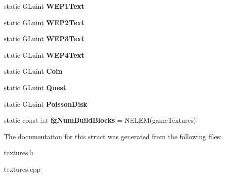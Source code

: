 \begin{DoxyCompactItemize}
\item 
\hypertarget{structGameTexture_a4ec826f487c9a94b2d5c1e7fefab3426}{static \-G\-Luint {\bfseries \-W\-E\-P1\-Text}}\label{structGameTexture_a4ec826f487c9a94b2d5c1e7fefab3426}

\item 
\hypertarget{structGameTexture_a4a8dced03cb4d8f8832c3acebad99e7e}{static \-G\-Luint {\bfseries \-W\-E\-P2\-Text}}\label{structGameTexture_a4a8dced03cb4d8f8832c3acebad99e7e}

\item 
\hypertarget{structGameTexture_a8ec2feb1898f8fa6a1d62fd3280b6c6c}{static \-G\-Luint {\bfseries \-W\-E\-P3\-Text}}\label{structGameTexture_a8ec2feb1898f8fa6a1d62fd3280b6c6c}

\item 
\hypertarget{structGameTexture_a591842d567b7793b42b6cf65bda489e3}{static \-G\-Luint {\bfseries \-W\-E\-P4\-Text}}\label{structGameTexture_a591842d567b7793b42b6cf65bda489e3}

\item 
\hypertarget{structGameTexture_aebbfe109cdf176674709c4d77ff47750}{static \-G\-Luint {\bfseries \-Coin}}\label{structGameTexture_aebbfe109cdf176674709c4d77ff47750}

\item 
\hypertarget{structGameTexture_a60e1e987f07d864e6de7bbb014c90ed4}{static \-G\-Luint {\bfseries \-Quest}}\label{structGameTexture_a60e1e987f07d864e6de7bbb014c90ed4}

\item 
\hypertarget{structGameTexture_ab3801b2260a969c516bca2daf965ead7}{static \-G\-Luint {\bfseries \-Poisson\-Disk}}\label{structGameTexture_ab3801b2260a969c516bca2daf965ead7}

\item 
\hypertarget{structGameTexture_aea608cff0c1905883643124b9c997136}{static const int {\bfseries fg\-Num\-Build\-Blocks} = \-N\-E\-L\-E\-M(game\-Textures)}\label{structGameTexture_aea608cff0c1905883643124b9c997136}

\end{DoxyCompactItemize}


\-The documentation for this struct was generated from the following files\-:\begin{DoxyCompactItemize}
\item 
textures.\-h\item 
textures.\-cpp\end{DoxyCompactItemize}
